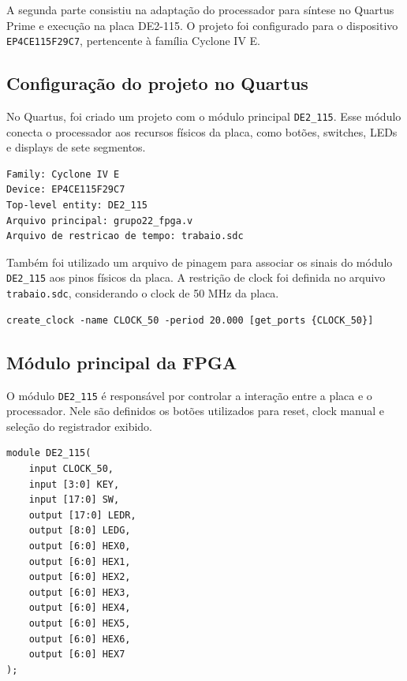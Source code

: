 \documentclass[12pt,a4paper]{article}
\begin{document}
A segunda parte consistiu na adaptação do processador para síntese no Quartus Prime e execução na placa DE2-115. O projeto foi configurado para o dispositivo \texttt{EP4CE115F29C7}, pertencente à família Cyclone IV E.

\subsection{Configuração do projeto no Quartus}

No Quartus, foi criado um projeto com o módulo principal \texttt{DE2\_115}. Esse módulo conecta o processador aos recursos físicos da placa, como botões, switches, LEDs e displays de sete segmentos.

\begin{lstlisting}[style=textstyle,caption={Configurações principais do projeto no Quartus.}]
Family: Cyclone IV E
Device: EP4CE115F29C7
Top-level entity: DE2_115
Arquivo principal: grupo22_fpga.v
Arquivo de restricao de tempo: trabaio.sdc
\end{lstlisting}

Também foi utilizado um arquivo de pinagem para associar os sinais do módulo \texttt{DE2\_115} aos pinos físicos da placa. A restrição de clock foi definida no arquivo \texttt{trabaio.sdc}, considerando o clock de 50 MHz da placa.

\begin{lstlisting}[style=textstyle,caption={Restrição de clock utilizada no arquivo trabaio.sdc.}]
create_clock -name CLOCK_50 -period 20.000 [get_ports {CLOCK_50}]
\end{lstlisting}

\subsection{Módulo principal da FPGA}

O módulo \texttt{DE2\_115} é responsável por controlar a interação entre a placa e o processador. Nele são definidos os botões utilizados para reset, clock manual e seleção do registrador exibido.

\begin{lstlisting}[style=verilogstyle,caption={Entradas e saídas principais do módulo DE2\_115.}]
module DE2_115(
    input CLOCK_50,
    input [3:0] KEY,
    input [17:0] SW,
    output [17:0] LEDR,
    output [8:0] LEDG,
    output [6:0] HEX0,
    output [6:0] HEX1,
    output [6:0] HEX2,
    output [6:0] HEX3,
    output [6:0] HEX4,
    output [6:0] HEX5,
    output [6:0] HEX6,
    output [6:0] HEX7
);
\end{lstlisting}
\end{document}
